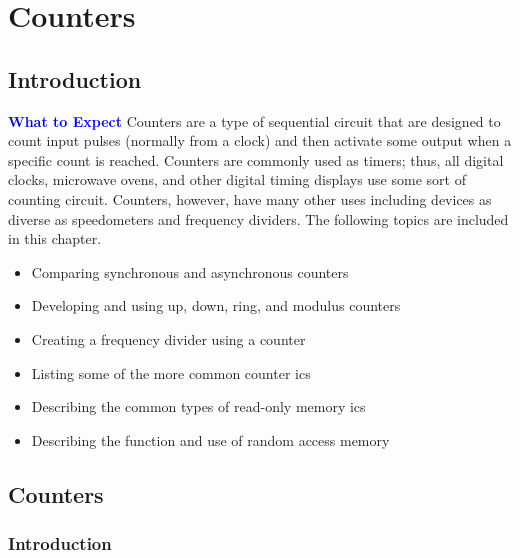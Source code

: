 \chapter{Counters}\label{ch11}
\section{Introduction}

\begin{tcolorbox}[colback=blue!5!white,colframe=blue!75!black]
	\textcolor{blue}{\textbf{What to Expect}}
	\tcblower
	Counters are a type of sequential circuit that are designed to count input pulses (normally from a clock) and then activate some output when a specific count is reached. Counters are commonly used as timers; thus, all digital clocks, microwave ovens, and other digital timing displays use some sort of counting circuit. Counters, however, have many other uses including devices as diverse as speedometers and frequency dividers. The following topics are included in this chapter. 
	
	\begin{itemize}
		\item Comparing synchronous and asynchronous counters
		\item Developing and using up, down, ring, and modulus counters
		\item Creating a frequency divider using a counter
		\item Listing some of the more common counter \glspl{ic}
		\item Describing the common types of read-only memory \glspl{ic}
		\item Describing the function and use of random access memory
	\end{itemize}
	
\end{tcolorbox}


\section{Counters}
\label{SL:sec:counters}

\subsection{Introduction}
\label{SL:subsec:intro_to_counters}

